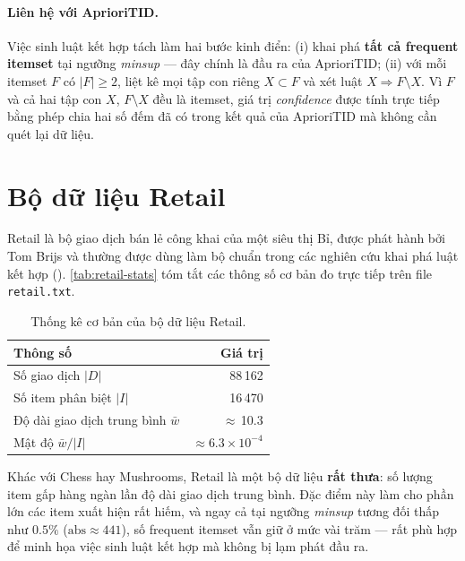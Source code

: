 \paragraph{Liên hệ với AprioriTID.} Việc sinh luật kết hợp tách làm hai bước kinh điển: (i) khai phá \textbf{tất cả frequent itemset} tại ngưỡng \textit{minsup} --- đây chính là đầu ra của AprioriTID; (ii) với mỗi itemset $F$ có $|F| \ge 2$, liệt kê mọi tập con riêng $X \subset F$ và xét luật $X \Rightarrow F \setminus X$. Vì $F$ và cả hai tập con $X$, $F \setminus X$ đều là itemset, giá trị \textit{confidence} được tính trực tiếp bằng phép chia hai số đếm đã có trong kết quả của AprioriTID mà không cần quét lại dữ liệu.

\section{Bộ dữ liệu Retail}
\label{sec:mba-data}

Retail là bộ giao dịch bán lẻ công khai của một siêu thị Bỉ, được phát hành bởi Tom Brijs và thường được dùng làm bộ chuẩn trong các nghiên cứu khai phá luật kết hợp (\cite{BrijsRetail1999}). \autoref{tab:retail-stats} tóm tắt các thông số cơ bản đo trực tiếp trên file \texttt{retail.txt}.

\begin{table}[htbp]
    \centering
    \caption{Thống kê cơ bản của bộ dữ liệu Retail.}
    \label{tab:retail-stats}
    \begin{tabular}{l|r}
        \hline
        \textbf{Thông số} & \textbf{Giá trị} \\ \hline
        Số giao dịch $|D|$       & 88\,162 \\
        Số item phân biệt $|I|$  & 16\,470 \\
        Độ dài giao dịch trung bình $\bar{w}$ & $\approx$\,10.3 \\
        Mật độ $\bar{w}/|I|$     & $\approx 6.3 \times 10^{-4}$ \\ \hline
    \end{tabular}
\end{table}

Khác với Chess hay Mushrooms, Retail là một bộ dữ liệu \textbf{rất thưa}: số lượng item gấp hàng ngàn lần độ dài giao dịch trung bình. Đặc điểm này làm cho phần lớn các item xuất hiện rất hiếm, và ngay cả tại ngưỡng \textit{minsup} tương đối thấp như $0.5\%$ ($\text{abs} \approx 441$), số frequent itemset vẫn giữ ở mức vài trăm --- rất phù hợp để minh họa việc sinh luật kết hợp mà không bị lạm phát đầu ra.

